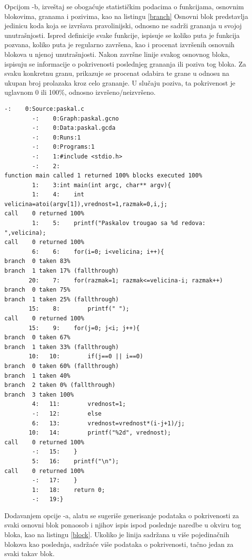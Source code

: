 \documentclass[12pt,oneside]{memoir}
\newcommand{\strano}[1]{\textit{#1}}
\begin{document}
Opcijom -b, izveštaj se obogaćuje statističkim podacima o funkcijama, osnovnim blokovima, granama i pozivima, kao na listingu \ref{branch} Osnovni blok predstavlja jedinicu koda koja se izvršava pravolinijski, odnosno ne sadrži grananja u svojoj unutrašnjosti. Ispred definicije svake funkcije, ispisuje se koliko puta je funkcija pozvana, koliko puta je regularno završena, kao i procenat izvršenih osnovnih blokova u njenoj unutrašnjosti. Nakon završne linije svakog osnovnog bloka, ispisuju se informacije o pokrivenosti poslednjeg grananja ili poziva tog bloka. Za svaku konkretnu granu, prikazuje se procenat odabira te grane u odnosu na ukupan broj prolazaka kroz celo grananje. U slučaju poziva, ta pokrivenost je uglavnom 0 ili 100\%, odnosno izvršeno/neizvršeno. 

\newpage
\begin{lstlisting}[caption={Primer izveštaja koji generiše alat \strano{gcov} sa opcijom -b},frame=single, label=branch]
        -:    0:Source:paskal.c
        -:    0:Graph:paskal.gcno
        -:    0:Data:paskal.gcda
        -:    0:Runs:1
        -:    0:Programs:1
        -:    1:#include <stdio.h>
        -:    2:
function main called 1 returned 100% blocks executed 100%
        1:    3:int main(int argc, char** argv){
        1:    4:    int velicina=atoi(argv[1]),vrednost=1,razmak=0,i,j;
call    0 returned 100%
        1:    5:    printf("Paskalov trougao sa %d redova: ",velicina);
call    0 returned 100%
        6:    6:    for(i=0; i<velicina; i++){
branch  0 taken 83%
branch  1 taken 17% (fallthrough)
       20:    7:	for(razmak=1; razmak<=velicina-i; razmak++)
branch  0 taken 75%
branch  1 taken 25% (fallthrough)
       15:    8:	    printf(" ");
call    0 returned 100%
       15:    9:	for(j=0; j<i; j++){
branch  0 taken 67%
branch  1 taken 33% (fallthrough)
       10:   10:	    if(j==0 || i==0)
branch  0 taken 60% (fallthrough)
branch  1 taken 40%
branch  2 taken 0% (fallthrough)
branch  3 taken 100%
        4:   11:		vrednost=1;
        -:   12:	    else
        6:   13:		vrednost=vrednost*(i-j+1)/j;
       10:   14:	    printf("%2d", vrednost);
call    0 returned 100%
        -:   15:	}
        5:   16:	printf("\n");
call    0 returned 100%
        -:   17:    }
        1:   18:    return 0;
        -:   19:}
\end{lstlisting}

Dodavanjem opcije -a, alatu se sugeriše generisanje podataka o pokrivenosti za svaki osnovni blok ponaosob i njihov ispis ispod poslednje naredbe u okviru tog bloka, kao na listingu \ref{block}. Ukoliko je linija sadržana u više pojedinačnih blokova kao poslednja, sadržaće više podataka o pokrivenosti, tačno jedan za svaki takav blok. 
\end{document}
